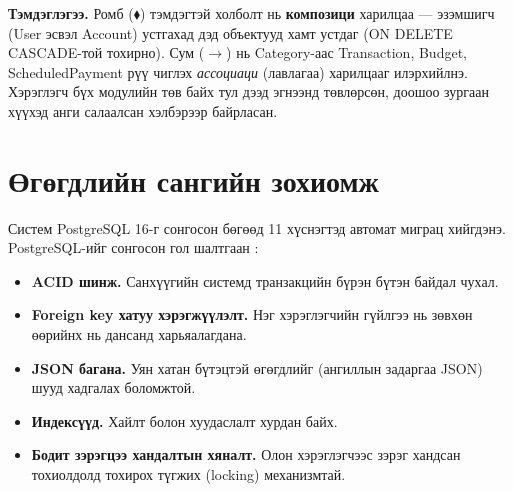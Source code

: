\textbf{Тэмдэглэгээ.} Ромб ($\blacklozenge$) тэмдэгтэй холболт нь \textbf{композици} харилцаа --- эзэмшигч (User эсвэл Account) устгахад дэд объектууд хамт устдаг (ON DELETE CASCADE-той тохирно). Сум ($\rightarrow$) нь Category-аас Transaction, Budget, ScheduledPayment рүү чиглэх \textit{ассоциаци} (лавлагаа) харилцааг илэрхийлнэ. Хэрэглэгч бүх модулийн төв байх тул дээд эгнээнд төвлөрсөн, доошоо зургаан хүүхэд анги салаалсан хэлбэрээр байрласан.

\section{Өгөгдлийн сангийн зохиомж}
Систем PostgreSQL 16-г сонгосон бөгөөд 11 хүснэгтэд автомат миграц хийгдэнэ.\\

PostgreSQL-ийг сонгосон гол шалтгаан \cite{kleppmann}:
\begin{itemize}
    \item \textbf{ACID шинж.} Санхүүгийн системд транзакцийн бүрэн бүтэн байдал чухал.
    \item \textbf{Foreign key хатуу хэрэгжүүлэлт.} Нэг хэрэглэгчийн гүйлгээ нь зөвхөн өөрийнх нь дансанд харьяалагдана.
    \item \textbf{JSON багана.} Уян хатан бүтэцтэй өгөгдлийг (ангиллын задаргаа JSON) шууд хадгалах боломжтой.
    \item \textbf{Индексүүд.} Хайлт болон хуудаслалт хурдан байх.
    \item \textbf{Бодит зэрэгцээ хандалтын хяналт.} Олон хэрэглэгчээс зэрэг хандсан тохиолдолд тохирох түгжих (locking) механизмтай.
\end{itemize}

